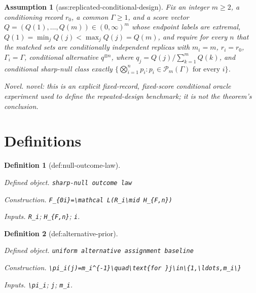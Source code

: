 \documentclass{article}
\newtheorem{assumption}{Assumption}
\newtheorem{definition}{Definition}
\begin{document}
\begin{assumption}[ass:replicated-conditional-design]\label{ass:replicated-conditional-design}
Fix an integer \(m\geq2\), a conditioning record \(r_0\), a common \(\Gamma\geq1\), and a score vector \(Q=(Q(1),\ldots,Q(m))\in(0,\infty)^m\) whose endpoint labels are extremal, \(Q(1)=\min_jQ(j)<\max_jQ(j)=Q(m)\), and require for every \(n\) that the matched sets are conditionally independent replicas with \(m_i=m\), \(r_i=r_0\), \(\Gamma_i=\Gamma\), conditional alternative \(q^{\otimes n}\), where \(q_j=Q(j)/\sum_{k=1}^mQ(k)\), and conditional sharp-null class exactly \(\{\bigotimes_{i=1}^np_i:p_i\in\mathcal P_m(\Gamma)\text{ for every }i\}\).
\par\smallskip\noindent\emph{Novel.} novel: this is an explicit fixed-record, fixed-score conditional oracle experiment used to define the repeated-design benchmark; it is not the theorem's conclusion.
\end{assumption}

\section{Definitions}

\begin{definition}[def:null-outcome-law]\label{def:null-outcome-law}
\par\smallskip\noindent\emph{Defined object.} \texttt{sharp-\allowbreak{}null outcome law}
\par\smallskip\noindent\emph{Construction.} \texttt{F\_\allowbreak{}\{0i\}\allowbreak{}=\allowbreak{}\textbackslash{}\allowbreak{}mathcal L(R\_\allowbreak{}i\textbackslash{}\allowbreak{}mid H\_\allowbreak{}\{F,\allowbreak{}n\}\allowbreak{})}
\par\smallskip\noindent\emph{Inputs.} \texttt{R\_\allowbreak{}i}; \texttt{H\_\allowbreak{}\{F,\allowbreak{}n\}\allowbreak{}}; \texttt{i}.
\end{definition}

\begin{definition}[def:alternative-prior]\label{def:alternative-prior}
\par\smallskip\noindent\emph{Defined object.} \texttt{uniform alternative assignment baseline}
\par\smallskip\noindent\emph{Construction.} \texttt{\textbackslash{}\allowbreak{}pi\_\allowbreak{}i(j)=\allowbreak{}m\_\allowbreak{}i\textasciicircum{}\{-\allowbreak{}1\}\allowbreak{}\textbackslash{}\allowbreak{}quad\textbackslash{}\allowbreak{}text\{for \}\allowbreak{}j\textbackslash{}\allowbreak{}in\textbackslash{}\allowbreak{}\{1,\allowbreak{}\textbackslash{}\allowbreak{}ldots,\allowbreak{}m\_\allowbreak{}i\textbackslash{}\allowbreak{}\}\allowbreak{}}
\par\smallskip\noindent\emph{Inputs.} \texttt{\textbackslash{}\allowbreak{}pi\_\allowbreak{}i}; \texttt{j}; \texttt{m\_\allowbreak{}i}.
\end{definition}
\end{document}

